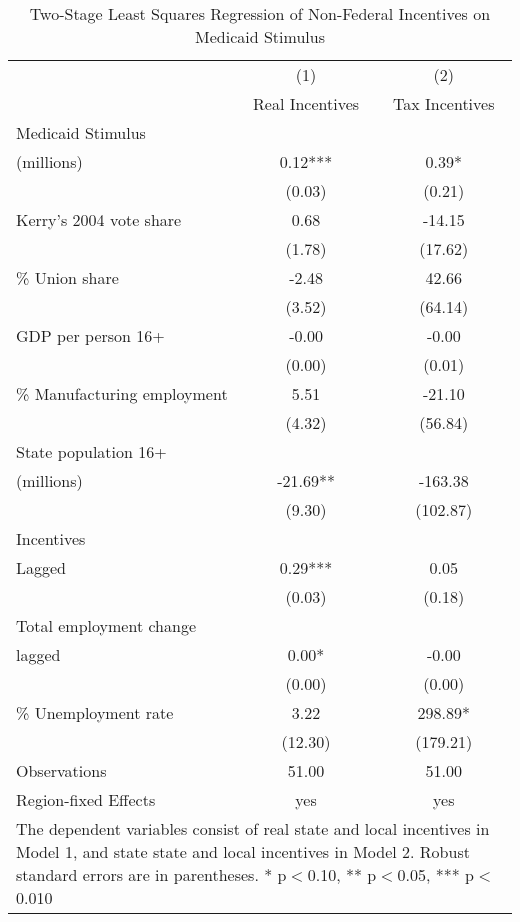 \begin{table}[!htbp]\centering
\def\sym#1{\ifmmode^{#1}\else\(^{#1}\)\fi}
\caption{Two-Stage Least Squares Regression of Non-Federal Incentives on Medicaid Stimulus}
\begin{tabular}{l*{2}{c}}
\hline\hline
                    &\multicolumn{1}{c}{(1)}   &\multicolumn{1}{c}{(2)}   \\
                    &Real Incentives   &Tax Incentives   \\
\hline
Medicaid Stimulus \\ (millions)&        0.12***&        0.39*  \\
                    &      (0.03)   &      (0.21)   \\
Kerry's 2004 vote share&        0.68   &      -14.15   \\
                    &      (1.78)   &     (17.62)   \\
\% Union share      &       -2.48   &       42.66   \\
                    &      (3.52)   &     (64.14)   \\
GDP per person 16+  &       -0.00   &       -0.00   \\
                    &      (0.00)   &      (0.01)   \\
\% Manufacturing employment&        5.51   &      -21.10   \\
                    &      (4.32)   &     (56.84)   \\
 State population 16+ \\ (millions)&      -21.69** &     -163.38   \\
                    &      (9.30)   &    (102.87)   \\
Incentives \\ Lagged&        0.29***&        0.05   \\
                    &      (0.03)   &      (0.18)   \\
Total employment change \\ lagged&        0.00*  &       -0.00   \\
                    &      (0.00)   &      (0.00)   \\
\% Unemployment rate&        3.22   &      298.89*  \\
                    &     (12.30)   &    (179.21)   \\
\hline
Observations        &       51.00   &       51.00   \\
Region-fixed Effects&         yes   &         yes   \\
\hline\hline
\multicolumn{3}{p{0.75\linewidth}}{\footnotesize The dependent variables consist of real state and local incentives in Model 1, and state state and local incentives in Model 2. Robust standard errors are in parentheses. * p$<$0.10, ** p$<$0.05, *** p$<$0.010}\\
\end{tabular}
\end{table}
